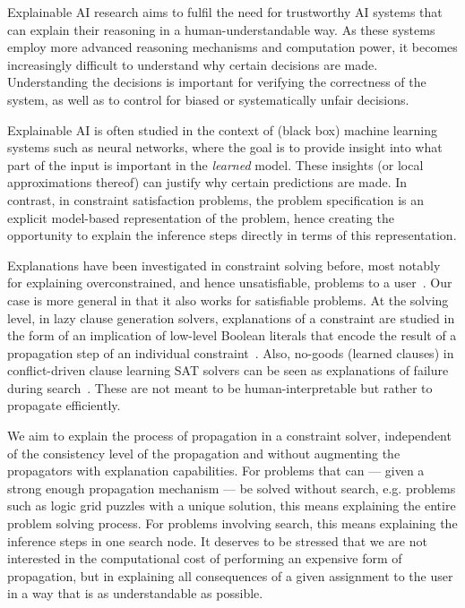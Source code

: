Explainable AI research aims to fulfil the need for trustworthy AI systems that can explain their reasoning in a human-understandable way. 
As these systems employ more advanced reasoning mechanisms and computation power, it becomes increasingly difficult to understand why certain decisions are made. 
Understanding the decisions is important for verifying the correctness of the system, as well as to control for biased or systematically unfair decisions.

Explainable AI is often studied in the context of (black box) machine learning systems such as neural networks, where the goal is to provide insight into what part of the input is important in the \textit{learned} model. These insights (or local approximations thereof) can justify why certain predictions are made. In contrast, in constraint satisfaction problems, the problem specification is an explicit model-based representation of the problem, hence creating the opportunity to explain the inference steps directly in terms of this representation.

Explanations have been investigated in constraint solving before, most notably for explaining overconstrained, and hence unsatisfiable, problems to a user~\cite{junker2001quickxplain}.
Our case is more general in that it also works for satisfiable problems.
At the solving level, in lazy clause generation solvers, explanations of a constraint are studied in the form of an implication of low-level Boolean literals that encode the result of a propagation step of an individual constraint~\cite{feydy2009lazy}. 
Also, no-goods (learned clauses) in conflict-driven clause learning SAT solvers can be seen as explanations of failure during search~\cite{marques2009conflict}. 
These are not meant to be human-interpretable but rather to propagate efficiently.

We aim to explain the process of propagation in a constraint solver, independent of the consistency level of the propagation and without augmenting the propagators with explanation capabilities.
For problems that can --- given a strong enough propagation mechanism --- be solved without search, e.g. problems such as logic grid puzzles with a unique solution, this means explaining the entire problem solving process. 
For problems involving search, this means explaining the inference steps  in one search node. 
It deserves to be stressed that we are not interested in the computational cost of performing an expensive form of propagation, but in explaining all consequences of a given assignment to the user in a way that is as understandable as possible. 

